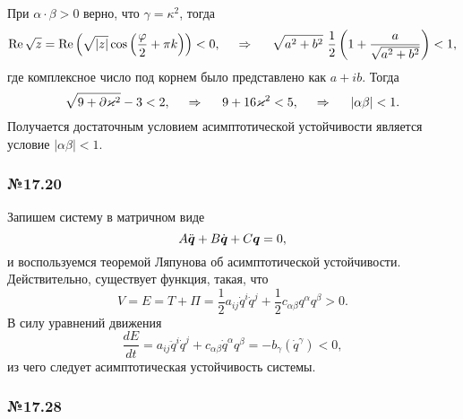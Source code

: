 При $\alpha \cdot \beta > 0$ верно, что $\gamma = \kappa^2$, тогда
\begin{equation*}
    \Re \sqrt{z} = \Re \left(
        \sqrt{|z|} \cos \left(
            \frac{\varphi}{2} + \pi k
        \right)
    \right) < 0,
    \hspace{0.5cm} \Rightarrow \hspace{0.5cm}
    \sqrt{a^2 + b^2} \ \frac{1}{2} \left(
        1 + \frac{a}{\sqrt{a^2 + b^2}}
    \right) < 1,
\end{equation*}
где комплексное число под корнем было представлено как $a + ib$. Тогда
\begin{equation*}
    \sqrt{9 + \partial \kappa^2} - 3 < 2,
    \hspace{0.5cm} \Rightarrow \hspace{0.5cm}
    9 + 16 \kappa^2 < 5, 
    \hspace{0.5cm} \Rightarrow \hspace{0.5cm}
    |\alpha \beta|  < 1.
\end{equation*}
Получается достаточным условием асимптотической устойчивости является условие $|\alpha \beta| < 1$.




\subsubsection*{№17.20}

Запишем систему в матричном виде
\begin{equation*}
    A \ddot{\vc{q}} + B \dot{\vc{q}} + C \vc{q} = 0,
\end{equation*}
и воспользуемся теоремой Ляпунова об асимптотической устойчивости. Действительно, существует функция, такая, что
\begin{equation*}
    V = E = T + \Pi = \frac{1}{2} a_{ij} \dot{q}^i \dot{q}^j + \frac{1}{2} c_{\alpha \beta} q^{\alpha} q^{\beta} > 0.
\end{equation*}
В силу уравнений движения
\begin{equation*}
    \frac{d E}{d t} = a_{ij} \ddot{q}^i \dot{q}^j + c_{\alpha \beta} \dot{q}^\alpha q^\beta = - b_\gamma (\dot{q}^\gamma) < 0,
\end{equation*}
из чего следует асимптотическая устойчивость системы.


\subsubsection*{№17.28}

